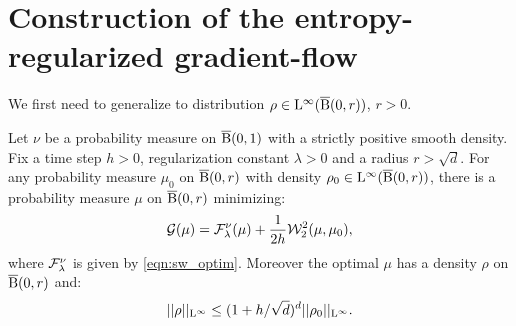 
\section{Construction of the entropy-regularized gradient-flow}

We first need to generalize \cite[Lemma 5.4.3]{bonnotte2013unidimensional} to distribution $\rho \in \mathrm{L}^{\infty}(\operatorname{\overline{B}}(0,r))$, $r >0$.
\begin{thm} \label{thm:implicit_step}
 Let $\nu$ be a probability measure on $\operatorname{\overline{B}}(0,1)$ with a strictly positive smooth density. Fix a time step $h > 0$, regularization constant $\lambda > 0$ and a radius $r > \sqrt{d}$. For any probability measure $\mu_0$ on $\operatorname{\overline{B}}(0, r)$ with density $\rho_0 \in \mathrm{L}^{\infty}(\operatorname{\overline{B}}(0, r))$, there is a probability measure $\mu$ on $\operatorname{\overline{B}}(0,r)$ minimizing:
\[
\mathcal{G}(\mu) = \mathcal{F}^{\nu}_{\lambda} (\mu) + \frac{1}{2h} {\cal W}_2^2(\mu, \mu_0) ,
\]
where $\mathcal{F}^{\nu}_\lambda$ is given by \eqref{eqn:sw_optim}.
Moreover the optimal $\mu$ has a density $\rho$ on $\operatorname{\overline{B}}(0,r)$ and:
\begin{equation} \label{ineq:inf_norm_bound}
||\rho||_{\mathrm{L}^{\infty}} \leq (1 + h/\sqrt{d})^d ||\rho_0||_{\mathrm{L}^{\infty}}.
\end{equation}
\end{thm}
